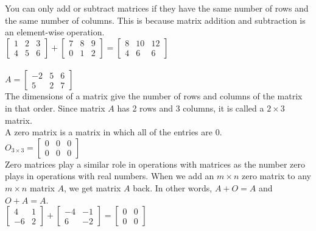 \documentclass{article}
\begin{document}
You can only add or subtract matrices if they have the same number of rows and the same number of columns. This is because matrix addition and subtraction is an element-wise operation.\\

$
\begin{bmatrix}
	1 & 2 & 3\\
	4 & 5 & 6
\end{bmatrix}
+
\begin{bmatrix}
	7 & 8 & 9\\
	0 & 1 & 2
\end{bmatrix}
=
\begin{bmatrix}
	8 & 10 & 12\\
	4 & 6 & 6
\end{bmatrix}
$\\\\

$A = 
\begin{bmatrix}
	-2 & 5 & 6\\
	5 & 2 & 7
\end{bmatrix}
$\\

The dimensions of a matrix give the number of rows and columns of the matrix in that order. Since matrix $A$ has 2 rows and 3 columns, it is called a $2 \times 3$ matrix.\\

A zero matrix is a matrix in which all of the entries are 0.\\

$O_{3 \times 3} = 
\begin{bmatrix}
	0 & 0 & 0\\
	0 & 0 & 0
\end{bmatrix}
$\\

Zero matrices play a similar role in operations with matrices as the number zero plays in operations with real numbers. When we add an $m \times n$ zero matrix to any $m \times n$ matrix $A$, we get matrix $A$ back. In other words, $A + O = A$ and $O + A = A$.\\

$
\begin{bmatrix}
	4 & 1\\
	-6 & 2
\end{bmatrix}
+
\begin{bmatrix}
	-4 & -1\\
	6 & -2
\end{bmatrix}
=
\begin{bmatrix}
	0 & 0\\
	0 & 0
\end{bmatrix}
$\\
\end{document}
